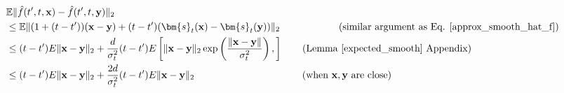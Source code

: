 \documentclass[11pt]{article}
\def\rvx{{\mathbf{x}}}
\def\rvy{{\mathbf{y}}}
\def\vs{{\bm{s}}}
\begin{document}
\begin{align*}
&\mathbb{E}\|\hat{f}(t',t,\rvx)-\hat{f}(t',t,\rvy)\|_2\\
&\leq \mathbb{E}\|(1+ (t-t')) (\rvx-\rvy)
+ (t-t') (\vs_t(\rvx)-\vs_t(\rvy)) \|_2 \qquad \qquad \qquad\text{(similar argument as Eq. \ref{approx_smooth_hat_f})} \\
&\leq
(t-t') E\|\rvx-\rvy\|_2 + \frac{d}{\sigma_t^2}(t-t') E\left[\|\rvx-\rvy\|_2 \exp\left(\frac{\|\rvx-\rvy\|}{\sigma_t^2}\right)  ,\right] \qquad \text{(Lemma \ref{expected_smooth} Appendix)} \\
&\leq (t-t') E\|\rvx-\rvy\|_2 + \frac{2d}{\sigma_t^2}(t-t') E\|\rvx-\rvy\|_2 \qquad\qquad \qquad \qquad \quad \qquad \text{(when $\rvx,\rvy$ are close)}
\end{align*}



\end{document}
